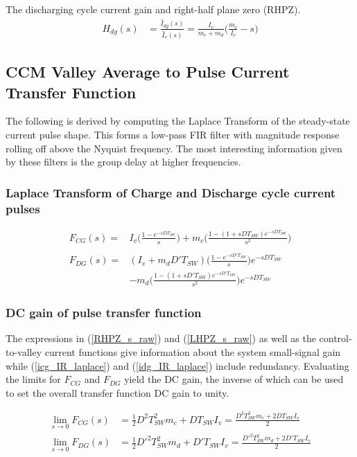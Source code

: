 \documentclass{scrartcl}
\begin{document}
		The discharging cycle current gain and right-half plane zero (RHPZ).
		\begin{align}
		H_{dg} (s) &= \frac{\hat{I}_{dg}(s)}{\hat{I}_{v}(s)} =\frac{I_{v}}{m_c + m_d}
		\big (\frac{m_c}{I_{v}} - s \big )
		\label{RHPZ_s_raw}
		\end{align}

		\subsection{CCM Valley Average to Pulse Current Transfer Function}	
		The following is derived by computing the Laplace Transform of the steady-state current pulse shape.  This forms a low-pass FIR filter with magnitude response rolling off above the Nyquist frequency.  The most interesting information given by these filters is the group delay at higher frequencies.
		
		\subsubsection{Laplace Transform of Charge and Discharge cycle current pulses}	
		
		\begin{align}
		F_{CG}(s) =&   I_{v} \bigg( \frac{1 - e^{-sDT_{SW}}}{s} \bigg)
		+ m_c\bigg( \frac{1 - (1 + sDT_{SW})e^{-sDT_{SW}}}{s^2} \bigg)
		\label{icg_IR_laplace} \\
		\nonumber\\
		F_{DG}(s) =& (I_{v} +m_d D'T_{SW}) \bigg( \frac{1 - e^{-sD'T_{SW}}}{s} \bigg)  e^{-sDT_{SW}}\nonumber\\
		&- m_d \bigg( \frac{1 - (1 + sD'T_{SW})e^{-sD'T_{SW}}}{s^2} \bigg)  e^{-sDT_{SW}}
		\label{idg_IR_laplace}
		\end{align}
		
		\subsubsection{DC gain of pulse transfer function}
		The expressions in (\ref{RHPZ_s_raw}) and (\ref{LHPZ_s_raw}) as well as the control-to-valley current functions give information about the system small-signal gain while (\ref{icg_IR_laplace}) and (\ref{idg_IR_laplace}) include redundancy. Evaluating the limits for $F_{CG}$ and $F_{DG}$ yield the DC gain, the inverse of which can be used to set the overall transfer function DC gain to unity.
		
		\begin{align}
		\lim_{s \to 0} F_{CG}(s) &= \frac{1}{2} D^2 T_{SW}^2m_c + D T_{SW} I_v = \frac{D^2 T_{SW}^2m_c + 2D T_{SW} I_v}{2} \label{lim_FCG} \\
		\lim_{s \to 0} F_{DG}(s) &= \frac{1}{2} D'^2 T_{SW}^2m_d + D' T_{SW} I_v= \frac{D'^2 T_{SW}^2m_d + 2D' T_{SW} I_v}{2} \label{lim_FDG}
		\end{align}
		
\end{document}
